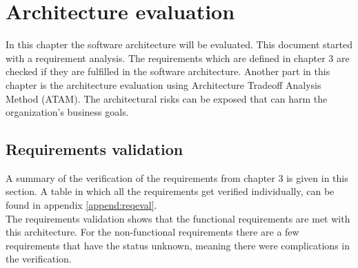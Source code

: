 
\newcommand{\bo}[1]{\textbf{#1}}

\chapter{Architecture evaluation}

\label{ch:evaluation}
In this chapter the software architecture will be evaluated. This document started with a requirement analysis. The requirements which are defined in chapter 3 are checked if they are fulfilled in the software architecture. Another part in this chapter is the architecture evaluation using Architecture Tradeoff Analysis Method (ATAM). The architectural risks can be exposed that can harm the organization's business goals.

\section{Requirements validation}

A summary of the verification of the requirements from chapter 3 is given in this section. A table in which all the requirements get verified individually, can be found in appendix \ref{append:reqeval}.\\
The requirements validation shows that the functional requirements are met with this architecture. For the non-functional requirements there are a few requirements that have the status unknown, meaning there were complications in the verification.




%

%

